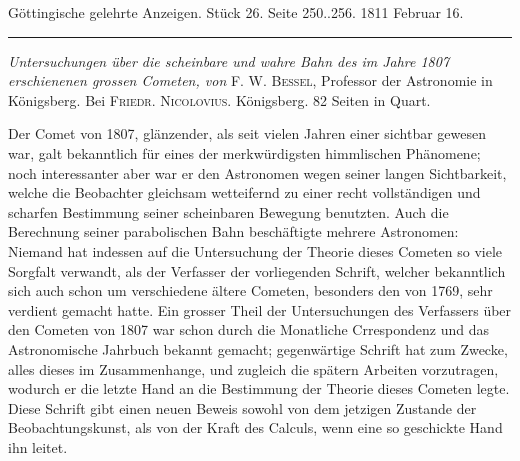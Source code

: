 \clearpage
{}
\hypertarget{native-535lower}{}\label{native-535lower}
\begin{center}\small Göttingische gelehrte Anzeigen. Stück 26. Seite 250..256. 1811 Februar 16.\\[3pt]\rule{.72\linewidth}{.3pt}\end{center}

\emph{Untersuchungen über die scheinbare und wahre Bahn des im Jahre \textup{1807} erschienenen grossen Cometen, von} F. W. \textsc{Bessel}, Professor der Astronomie in Königsberg. Bei \textsc{Friedr. Nicolovius}. Königsberg. 82 Seiten in Quart.

Der Comet von 1807, glänzender, als seit vielen Jahren einer sichtbar gewesen war, galt bekanntlich für eines der merkwürdigsten himmlischen Phänomene; noch interessanter aber war er den Astronomen wegen seiner langen Sichtbarkeit, welche die Beobachter gleichsam wetteifernd zu einer recht vollständigen und scharfen Bestimmung seiner scheinbaren Bewegung benutzten. Auch die Berechnung seiner parabolischen Bahn beschäftigte mehrere Astronomen: Niemand hat indessen auf die Untersuchung der Theorie dieses Cometen so viele Sorgfalt verwandt, als der Verfasser der vorliegenden Schrift, welcher bekanntlich sich auch schon um verschiedene ältere Cometen, besonders den von 1769, sehr verdient gemacht hatte. Ein grosser Theil der Untersuchungen des Verfassers über den Cometen von 1807 war schon durch die Monatliche Crrespondenz und das Astronomische Jahrbuch bekannt gemacht; gegenwärtige Schrift hat zum Zwecke, alles dieses im Zusammenhange, und zugleich die spätern Arbeiten vorzutragen, wodurch er die letzte Hand an die Bestimmung der Theorie dieses Cometen legte. Diese Schrift gibt einen neuen Beweis sowohl von dem jetzigen Zustande der Beobachtungskunst, als von der Kraft des Calculs, wenn eine so geschickte Hand ihn leitet.

